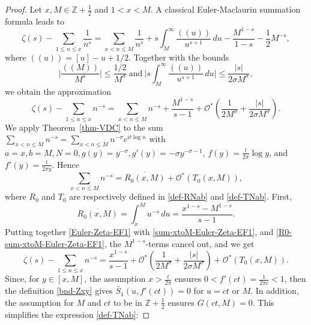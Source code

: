 \documentclass[11pt,letterpaper,oneside,reqno]{amsart}
\renewcommand{\^}[1]{\widehat{#1}}
\newcommand{\s}{\sigma}
\numberwithin{equation}{section}
\theoremstyle{remark}
\newcommand*{\thmref}[1]{Theorem~\ref{#1}}
\begin{document}
\begin{proof}
Let $x,M\in \mathbb{Z}+\frac{1}{2}$ and $1<x<M$. 
A classical Euler-Maclaurin summation formula leads to
\begin{equation} 
\zeta(s) - \sum_{1 \leq n \leq x} \frac{1}{n^s} = \sum_{x < n \leq M} \frac{1}{n^s} + s \int_M^\infty \frac{((u))}{u^{s+1}} \,du - \frac{M^{1-s}}{1-s} - \frac{1}{2}M^{-s}, \label{5.2}
\end{equation}
where $((u)) = [u] - u + 1/2$. 
Together with the bounds
    \begin{equation}\label{5.3}  \bigg| \frac{((M))}{M^s}\bigg|  \leq \frac{1/2}{M^\sigma} \ \text{and}\ 
    \bigg| s \int_M^\infty \frac{((u))}{u^{s+1}} \,du \bigg|  \leq %
    \frac{|s|}{2\sigma M^\sigma}, 
\end{equation} 
we obtain the approximation 
\begin{equation}
    \zeta(s)-\sum_{1\leq n\leq x}n^{-s}=\sum_{x <n\leq M}n^{-s}+\frac{M^{1-s}}{s-1}+\mathcal{O^*}\left(\frac{1}{2M^{\s}}+\frac{|s|}{2\s M^{\s}}\right) .\label{Euler-Zeta-EF1}
\end{equation}
We apply \thmref{thm-VDC} to the sum 
$\overline{\sum_{x<n\leq M}n^{-s}}=\sum_{x<n\leq M}n^{-\s}e^{it \log n} $ 
with $a=x, b=M, N=0, g(y)=y^{-\s}, g'(y) = -\s y^{-\s-1}$, $ f(y)=\frac{t}{2\pi}\log y$, and $f'(y)=\frac{t}{2\pi y}$. Hence 
\begin{equation} \label{sum-xtoM-Euler-Zeta-EF1}
  \sum_{x<n\leq M}n^{-s} 
  = \overline{R_0(x,M)}+\mathcal{O^*}(T_0(x,M)),
\end{equation}
where $R_0$ and $T_0$ are respectively defined in \eqref{def-RNab} and \eqref{def-TNab}. 
First, 
\begin{equation}
\label{R0-sum-xtoM-Euler-Zeta-EF1}
   \overline{R_0(x,M)} 
   = \int_{x}^M u^{-s}
\,du = \frac{x^{1-s}-M^{1-s}}{s-1} .  \end{equation} 
Putting together \eqref{Euler-Zeta-EF1} with \eqref{sum-xtoM-Euler-Zeta-EF1}, and \eqref{R0-sum-xtoM-Euler-Zeta-EF1}, the $M^{1-s}$-terms cancel out, and we get
\begin{equation}\label{bnd1-Zeta-EF1}
    \zeta(s) - 
    \sum_{1 \leq n\leq x}n^{-s}
     = \frac{x^{1-s} %
    }{s-1}
    + \mathcal{O^*}\left(\frac{1}{2M^{\s}}+\frac{|s|}{2\s M^{\s}}\right)
    +\mathcal{O^*}(T_0(x,M)) .
\end{equation}
Since, for $y \in [x,M]$, the assumption $x>\frac{t}{2\pi}$ ensures 
$ 0<f'(ct)= \frac{1}{2 \pi c }<1$, then the definition \eqref{bnd-Zxy} gives $\tilde{S_1}(u,f'(ct))=0$ for $u=ct$ or $M$. In addition, the assumption for $M$ and $ct$ to be in $\mathbb{Z}+\frac{1}{2}$ ensures $G(ct, M) =0$. This simplifies the expression \eqref{def-TNab}:

\end{proof}
\end{document}
